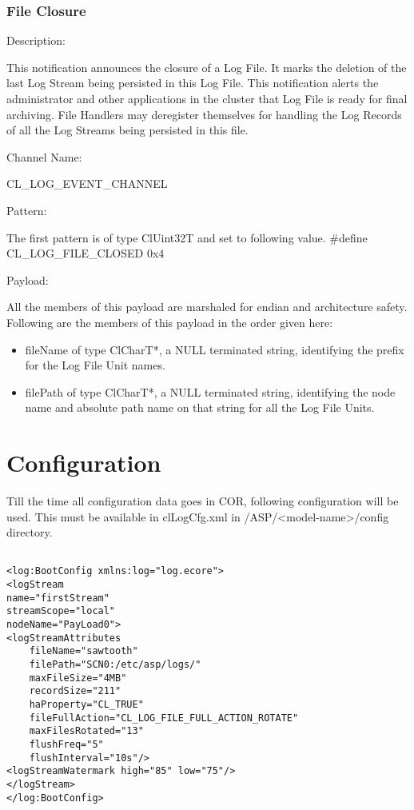 \begin{flushleft}
\subsection{File Closure}
\begin{Desc}
\item[Description:]\end{Desc}
This notification announces the closure of a Log File. It marks the deletion of the last Log Stream being persisted in this Log File. This notification
alerts the administrator and other applications in the cluster that Log File is ready for final archiving. File Handlers may deregister themselves for 
handling the Log Records of all the Log Streams being persisted in this file.
\begin{Desc}
\item[Channel Name:]\end{Desc}
CL\_\-LOG\_\-EVENT\_\-CHANNEL
\begin{Desc}
\item[Pattern:]\end{Desc}
The first pattern is of type ClUint32T and set to following value.
\#define CL\_\-LOG\_\-FILE\_\-CLOSED	0x4
\begin{Desc}
\item[Payload:]\end{Desc}
All the members of this payload are marshaled for endian and architecture safety. Following are the members of this payload in the order given here:
\begin{itemize}
\item
fileName of type ClCharT*, a NULL terminated string, identifying the prefix for the Log File Unit names.
\item
filePath of type ClCharT*, a NULL terminated string, identifying the node name and absolute path name on that string for all the Log File Units.
\end{itemize}


\chapter{Configuration}

Till the time all configuration data goes in COR, following configuration will be used. This must be available in clLogCfg.xml in
/ASP/<model-name>/config directory.
\footnotesize\begin{verbatim}        	

<log:BootConfig xmlns:log="log.ecore">
<logStream
name="firstStream"
streamScope="local"
nodeName="PayLoad0">
<logStreamAttributes
	fileName="sawtooth"
	filePath="SCN0:/etc/asp/logs/"
	maxFileSize="4MB"
	recordSize="211"
	haProperty="CL_TRUE"
	fileFullAction="CL_LOG_FILE_FULL_ACTION_ROTATE"
	maxFilesRotated="13"
	flushFreq="5"
	flushInterval="10s"/>
<logStreamWatermark high="85" low="75"/>
</logStream>
</log:BootConfig>


\end{verbatim}
\end{flushleft}
